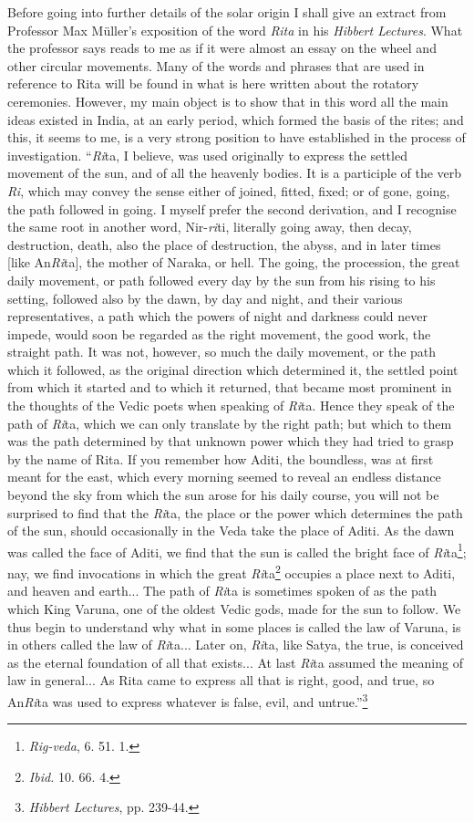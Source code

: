 \documentclass[a4paper, 11pt, oneside, polutonikogreek, english]{article}
\begin{document}
Before going into further details of the solar origin I shall give an extract from Professor Max Müller's exposition of the word \emph{Rita} in his \emph{Hibbert Lectures}. What the professor says reads to me as if it were almost an essay on the wheel and other circular movements. Many of the words and phrases that are used in reference to Rita will be found in what is here written about the rotatory ceremonies. However, my main object is to show that in this word all the main ideas existed in India, at an early period, which formed the basis of the rites; and this, it seems to me, is a very strong position to have established in the process of investigation. ``\emph{Ri}ta, I believe, was used originally to express the settled movement of the sun, and of all the heavenly bodies. It is a participle of the verb \emph{Ri}, which may convey the sense either of joined, fitted, fixed; or of gone, going, the path followed in going. I myself prefer the second derivation, and I recognise the same root in another word, Nir-\emph{ri}ti, literally going away, then decay, destruction, death, also the place of destruction, the abyss, and in later times [like An\emph{Ri}ta], the mother of Naraka, or hell. The going, the procession, the great daily movement, or path followed every day by the sun from his rising to his setting, followed also by the dawn, by day and night, and their various representatives, a path which the powers of night and darkness could never impede, would soon be regarded as the right movement, the good work, the straight path. It was not, however, so much the daily movement, or the path which it followed, as the original direction which determined it, the settled point from which it started and to which it returned, that became most prominent in the thoughts of the Vedic poets when speaking of \emph{Ri}ta. Hence they speak of the path of \emph{Ri}ta, which we can only translate by the right path; but which to them was the path determined by that unknown power which they had tried to grasp by the name of Rita. If you remember how Aditi, the boundless, was at first meant for the east, which every morning seemed to reveal an endless distance beyond the sky from which the sun arose for his daily course, you will not be surprised to find that the \emph{Ri}ta, the place or the power which determines the path of the sun, should occasionally in the Veda take the place of Aditi. As the dawn was called the face of Aditi, we find that the sun is called the bright face of \emph{Ri}ta\footnote{\emph{Rig-veda}, 6. 51. 1.}; nay, we find invocations in which the great \emph{Ri}ta\footnote{\emph{Ibid.} 10. 66. 4.} occupies a place next to Aditi, and heaven and earth... The path of \emph{Ri}ta is sometimes spoken of as the path which King Varuna, one of the oldest Vedic gods, made for the sun to follow. We thus begin to understand why what in some places is called the law of Varuna, is in others called the law of \emph{Ri}ta... Later on, \emph{Ri}ta, like Satya, the true, is conceived as the eternal foundation of all that exists... At last \emph{Ri}ta assumed the meaning of law in general... As Rita came to express all that is right, good, and true, so An\emph{Ri}ta was used to express whatever is false, evil, and untrue.''\footnote{\emph{Hibbert Lectures}, pp. 239-44.}
\end{document}
